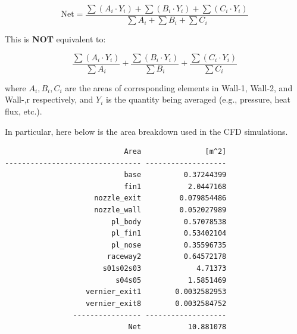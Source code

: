 \documentclass[12pt]{article}
\begin{document}
$$
\text{Net} = \frac{\sum (A_i \cdot Y_i) + \sum (B_i \cdot Y_i) + \sum (C_i \cdot Y_i)}{\sum A_i + \sum B_i + \sum C_i}
$$

This is \textbf{NOT} equivalent to:

$$
\frac{\sum (A_i \cdot Y_i)}{\sum A_i} + \frac{\sum (B_i \cdot Y_i)}{\sum B_i} + \frac{\sum (C_i \cdot Y_i)}{\sum C_i}
$$

where $ A_i, B_i, C_i $ are the areas of corresponding elements in Wall-1, Wall-2, and Wall-,r respectively, and $ Y_i $ is the quantity being averaged (e.g., pressure, heat flux, etc.).

In particular, here below is the area breakdown used in the CFD simulations.
\begin{verbatim}
                            Area               [m^2]
-------------------------------- -------------------
                            base          0.37244399
                            fin1           2.0447168
                     nozzle_exit         0.079854486
                     nozzle_wall         0.052027989
                         pl_body          0.57078538
                         pl_fin1          0.53402104
                         pl_nose          0.35596735
                        raceway2          0.64572178
                       s01s02s03             4.71373
                          s04s05           1.5851469
                   vernier_exit1        0.0032582953
                   vernier_exit8        0.0032584752
                ---------------- -------------------
                             Net           10.881078
\end{verbatim}
\end{document}

